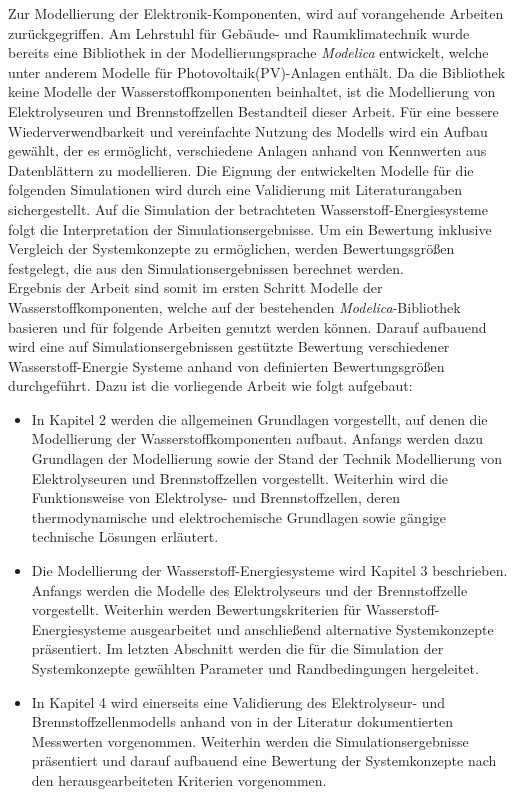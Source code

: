 Zur Modellierung der Elektronik-Komponenten, wird auf vorangehende Arbeiten zurückgegriffen. Am Lehrstuhl für Gebäude- und Raumklimatechnik wurde bereits eine Bibliothek in der Modellierungsprache \textit{Modelica} entwickelt, welche unter anderem Modelle für Photovoltaik(PV)-Anlagen enthält. Da die Bibliothek keine Modelle der Wasserstoffkomponenten beinhaltet, ist die Modellierung von Elektrolyseuren und Brennstoffzellen Bestandteil dieser Arbeit. Für eine bessere Wiederverwendbarkeit und vereinfachte Nutzung des Modells wird ein Aufbau gewählt, der es ermöglicht, verschiedene Anlagen anhand von Kennwerten aus Datenblättern zu modellieren. Die Eignung der entwickelten Modelle für die folgenden Simulationen wird durch eine Validierung mit Literaturangaben sichergestellt. Auf die Simulation der betrachteten Wasserstoff-Energiesysteme folgt die Interpretation der Simulationsergebnisse. Um ein Bewertung inklusive Vergleich der Systemkonzepte zu ermöglichen, werden Bewertungsgrößen festgelegt, die aus den Simulationsergebnissen berechnet werden.\\

Ergebnis der Arbeit sind somit im ersten Schritt Modelle der Wasserstoffkomponenten, welche auf der bestehenden \textit{Modelica}-Bibliothek basieren und für folgende Arbeiten genutzt werden können. Darauf aufbauend wird eine auf Simulationsergebnissen gestützte Bewertung verschiedener Wasserstoff-Energie Systeme anhand von definierten Bewertungsgrößen durchgeführt. Dazu ist die vorliegende Arbeit wie folgt aufgebaut:

\begin{itemize}
\item In Kapitel 2 werden die allgemeinen Grundlagen vorgestellt, auf denen die Modellierung der Wasserstoffkomponenten aufbaut. Anfangs werden dazu Grundlagen der Modellierung sowie der Stand der Technik Modellierung von Elektrolyseuren und Brennstoffzellen vorgestellt. Weiterhin wird die Funktionsweise von Elektrolyse- und Brennstoffzellen, deren thermodynamische und elektrochemische Grundlagen sowie gängige technische Lösungen erläutert.
\item Die Modellierung der Wasserstoff-Energiesysteme wird Kapitel 3 beschrieben. Anfangs werden die Modelle des Elektrolyseurs und der Brennstoffzelle vorgestellt. Weiterhin werden Bewertungskriterien für Wasserstoff-Energiesysteme ausgearbeitet und anschließend alternative Systemkonzepte präsentiert. Im letzten Abschnitt werden die für die Simulation der Systemkonzepte gewählten Parameter und Randbedingungen hergeleitet.
\item In Kapitel 4 wird einerseits eine Validierung des Elektrolyseur- und Brennstoffzellenmodells anhand von in der Literatur dokumentierten Messwerten vorgenommen. Weiterhin werden die Simulationsergebnisse präsentiert und darauf aufbauend eine Bewertung der Systemkonzepte nach den herausgearbeiteten Kriterien vorgenommen.
\end{itemize}
